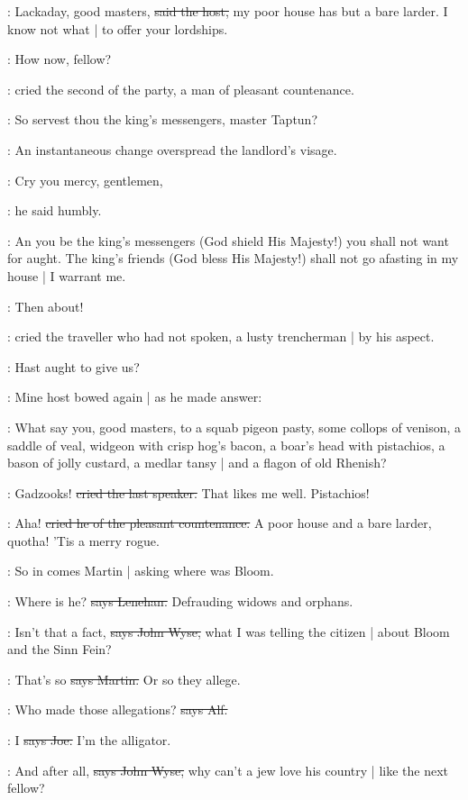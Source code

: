 \terry:
Lackaday,
good masters,
\sout{said the host,}
my poor house has but a bare larder.
I know not what |
to offer your lordships.

\power:
How now,
fellow?

:
cried the second of the party,
a man of pleasant countenance.

\power:
So servest thou the king's messengers,
master Taptun?

:
An instantaneous change overspread the landlord's visage.

\terry:
Cry you mercy,
gentlemen,

:
he said humbly.

\terry:
An you be the king's messengers
(God shield His Majesty!)
you shall not want for aught.
The king's friends
(God bless His Majesty!)
shall not go afasting in my house |
I warrant me.

\crofton:
Then about!

:
cried the traveller who had not spoken,
a lusty trencherman |
by his aspect.

\crofton:
Hast aught to give us?

:
Mine host bowed again |
as he made answer:

\terry:
What say you,
good masters,
to a squab pigeon pasty,
some collops of venison,
a saddle of veal,
widgeon with crisp hog's bacon,
a boar's head with pistachios,
a bason of jolly custard,
a medlar tansy |
and a flagon of old Rhenish?

\crofton:
Gadzooks!
\sout{cried the last speaker.}
That likes me well.
Pistachios!

\power:
Aha!
\sout{cried he of the pleasant countenance.}
A poor house and a bare larder,
quotha!
'Tis a merry rogue.

\Nq:
So in comes Martin |
asking where was Bloom.

\lenehan:
Where is he?
\sout{says Lenehan.}
Defrauding widows and orphans.

\johnwyse:
Isn't that a fact,
\sout{says John Wyse,}
what I was telling the citizen |
about Bloom and the Sinn Fein?

\cunningham:
That's so
\sout{says Martin.}
Or so they allege.

\bergan:
Who made those allegations?
\sout{says Alf.}

\joe:
I
\sout{says Joe.}
I'm the alligator.

\johnwyse:
And after all,
\sout{says John Wyse,}
why can't a jew love his country |
like the next fellow?

